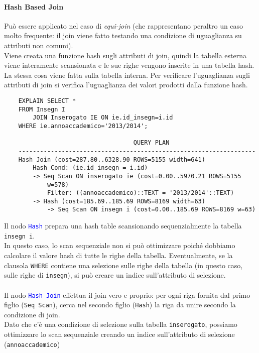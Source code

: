 \documentclass[12pt,a4paper]{book}
\begin{document}
	\paragraph{Hash Based Join} Può essere applicato nel caso di \textit{equi-join} (che rappresentano peraltro un caso molto frequente: il join viene fatto testando una condizione di uguaglianza su attributi non comuni). \\Viene creata una funzione hash sugli attributi di join, quindi la tabella esterna viene interamente scansionata e le sue righe vengono inserite in una tabella hash. La stessa cosa viene fatta sulla tabella interna. Per verificare l'uguaglianza sugli attributi di join si verifica l'uguaglianza dei valori prodotti dalla funzione hash.\vspace{10px}
	\begin{tcolorbox}[enhanced jigsaw, breakable, title=Esempio: piano di esecuzione di un Hash Join, title filled]
	\begin{lstlisting}
	EXPLAIN SELECT * 
	FROM Insegn I 
		JOIN Inserogato IE ON ie.id_insegn=i.id 
	WHERE ie.annoaccademico='2013/2014';
	
									QUERY PLAN
	------------------------------------------------------------------
	Hash Join (cost=287.80..6328.90 ROWS=5155 width=641)
		Hash Cond: (ie.id_insegn = i.id)
		-> Seq Scan ON inserogato ie (cost=0.00..5970.21 ROWS=5155
			w=578)
			Filter: ((annoaccademico)::TEXT = '2013/2014'::TEXT)
		-> Hash (cost=185.69..185.69 ROWS=8169 width=63)
			-> Seq Scan ON insegn i (cost=0.00..185.69 ROWS=8169 w=63)
	\end{lstlisting}
	Il nodo \textcolor{blue}{\texttt{Hash}} prepara una hash table scansionando sequenzialmente la tabella \texttt{insegn i}.\\
	In questo caso, lo scan sequenziale non si può ottimizzare poiché dobbiamo calcolare il valore hash di tutte le righe della tabella. Eventualmente, se la clausola \texttt{WHERE} contiene una selezione sulle righe della tabella (in questo caso, sulle righe di \texttt{insegn}), si può creare un indice sull'attributo di selezione.\\\\
	Il nodo \textcolor{blue}{\texttt{Hash Join}} effettua il join vero e proprio: per ogni riga fornita dal primo figlio (\texttt{Seq Scan}), cerca nel secondo figlio (\texttt{Hash}) la riga da unire secondo la condizione di join.\\
	Dato che c'è una condizione di selezione sulla tabella \texttt{inserogato}, possiamo ottimizzare lo scan sequenziale creando un indice sull'attributo di selezione (\texttt{annoaccademico})
	\end{tcolorbox}
\end{document}

